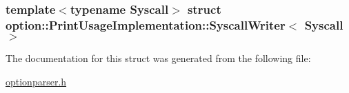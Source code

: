 \subsubsection*{template$<$typename Syscall$>$ struct option\-::\-Print\-Usage\-Implementation\-::\-Syscall\-Writer$<$ Syscall $>$}



\-The documentation for this struct was generated from the following file\-:\begin{DoxyCompactItemize}
\item 
\hyperlink{optionparser_8h}{optionparser.\-h}\end{DoxyCompactItemize}
